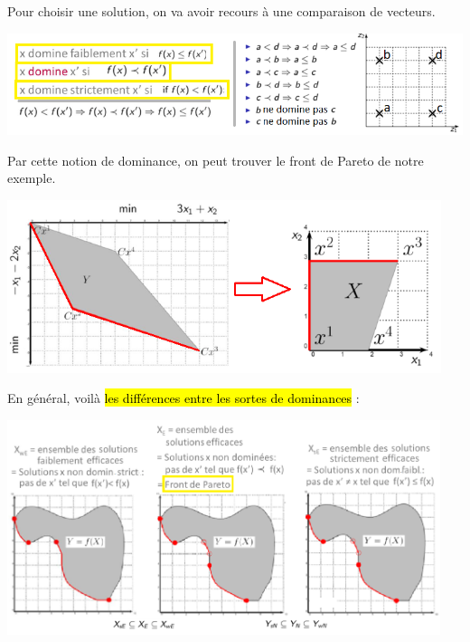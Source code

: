 \documentclass[a4paper, 12pt]{article}
\newcommand{\alinea}{
\hspace*{0.5cm}}
\begin{document}
	\alinea Pour choisir une solution, on va avoir recours à une comparaison de vecteurs.
	\begin{center}
		\includegraphics[width=\textwidth]{Images/dominance}
	\end{center}
	\alinea Par cette notion de dominance, on peut trouver le front de Pareto de notre exemple.
	\begin{center}
		\includegraphics[width=5in]{Images/pareto}
	\end{center}
	\alinea En général, voilà \hl{les différences entre les sortes de dominances} :
	\begin{center}
		\includegraphics[width=0.95\textwidth]{Images/efficace}
	\end{center}
\end{document}
